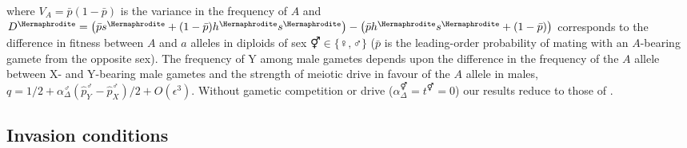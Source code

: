 \documentclass[12pt]{article}
\begin{document}
\noindent
where $V_{A}=\bar{p}(1-\bar{p})$ is the variance in the frequency of $A$ and $D^\Hermaphrodite=\big{(} \bar{p}s^\Hermaphrodite+(1-\bar{p})h^\Hermaphrodite s^\Hermaphrodite\big{)} -\big{(} \bar{p}h^\Hermaphrodite s^\Hermaphrodite+(1-\bar{p}) \big{)}$ corresponds to the difference in fitness between $A$ and $a$ alleles in diploids of sex $\Hermaphrodite \in \{\female,\male\}$ ($\bar{p}$ is the leading-order probability of mating with an $A$-bearing gamete from the opposite sex). 
The frequency of Y among male gametes depends upon the difference in the frequency of the $A$ allele between X- and Y-bearing male gametes and the strength of meiotic drive in favour of the $A$ allele in males, $q=1/2+\alpha_{\Delta}^\male(\hat{p}^\male_Y-\hat{p}^\male_X)/2+O(\epsilon^3)$.
Without gametic competition or drive ($\alpha_{\Delta}^\Hermaphrodite=t^\Hermaphrodite=0$) our results reduce to those of \citet{vanDoorn:2007eu}.


\subsection*{Invasion conditions}

 
\end{document}
